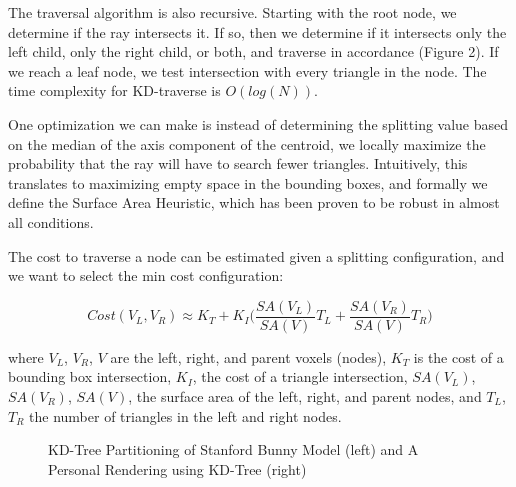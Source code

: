\documentclass{article}
\begin{document}
The traversal algorithm is also recursive. Starting with the root node, we determine if the ray intersects it. If so, then we determine if it intersects only the left child, only the right child, or both, and traverse in accordance (Figure 2). If we reach a leaf node, we test intersection with every triangle in the node. The time complexity for KD-traverse is $O(log(N))$. 

One optimization we can make is instead of determining the splitting value based on the median of the axis component of the centroid, we locally maximize the probability that the ray will have to search fewer triangles. Intuitively, this translates to maximizing empty space in the bounding boxes, and formally we define the Surface Area Heuristic, which has been proven to be robust in almost all conditions.

The cost to traverse a node can be estimated given a splitting configuration, and we want to select the min cost configuration:

$$ Cost(V_L, V_R) \approx K_T + K_I\bigg(\frac{SA(V_L)}{SA(V)}T_L + \frac{SA(V_R)}{SA(V)}T_R \bigg) $$

where $V_L$, $V_R$, $V$ are the left, right, and parent voxels (nodes), $K_T$ is the cost of a bounding box intersection, $K_I$, the cost of a triangle intersection, $SA(V_L)$, $SA(V_R)$, $SA(V)$, the surface area of the left, right, and parent nodes, and $T_L$, $T_R$ the number of triangles in the left and right nodes.

\begin{figure}[!htbp]
 \centering
    \qquad
    \caption{KD-Tree Partitioning of Stanford Bunny Model (left) and A Personal Rendering using KD-Tree (right)}%
    \label{fig:example}%
\end{figure}
\end{document}
